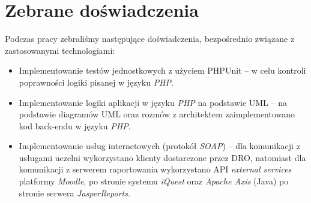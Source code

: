 \chapter{Zebrane doświadczenia}
\label{Chapter8}

Podczas pracy zebraliśmy następujące doświadczenia, bezpośrednio związane z zastosowanymi technologiami:
\begin{itemize}
\item Implementowanie testów jednostkowych z użyciem PHPUnit -- w celu kontroli poprawności logiki pisanej w języku \textit{PHP}.
\item Implementowanie logiki aplikacji w języku \textit{PHP} na podstawie UML -- na podstawie diagramów UML oraz rozmów z architektem zaimplementowano kod back-endu w języku \textit{PHP}.
\item Implementowanie usług internetowych (protokół \textit{SOAP}) -- dla komunikacji z usługami uczelni wykorzystano klienty dostarczone przez DRO, natomiast dla komunikacji z serwerem raportowania wykorzystano API \textit{external services} platformy \textit{Moodle}, po stronie systemu \textit{iQuest} oraz \textit{Apache Axis} (Java) po stronie serwera \textit{JasperReports}.


\end{itemize}

